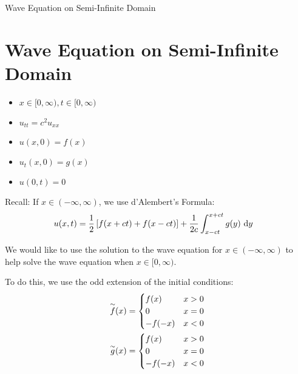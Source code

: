 \documentclass{article}
\begin{document}
{Wave Equation on Semi-Infinite Domain}
\newpage

\section{Wave Equation on Semi-Infinite Domain}
\begin{itemize}
  \item $x \in [0, \infty), t \in [0, \infty)$
  \item $u_{tt} = c^2 u_{xx}$
  \item $u(x, 0) = f(x)$
  \item $u_t(x, 0) = g(x)$
  \item $u(0, t) = 0$
\end{itemize}

Recall: If $x \in (-\infty, \infty)$, we use d'Alembert's Formula:
%
\begin{align}
  u(x, t) & = \frac{1}{2} \left[ f(x + ct) + f(x - ct) \right] +
  \frac{1}{2c} \int^{x + ct}_{x - ct} g(y)\ \text dy
\end{align}

We would like to use the solution to the wave equation for
$x \in (-\infty, \infty)$
to help solve the wave equation when
$x \in [0, \infty)$.

To do this, we use the odd extension of the initial conditions:
%
\begin{align}
  \overset{\sim}{f}(x) & =
  \begin{cases}
    f(x) & x > 0\\
    0 & x = 0\\
    -f(-x) & x < 0
  \end{cases}\\
  \overset{\sim}{g}(x) & =
  \begin{cases}
    f(x) & x > 0\\
    0 & x = 0\\
    -f(-x) & x < 0
  \end{cases}
\end{align}
\end{document}
